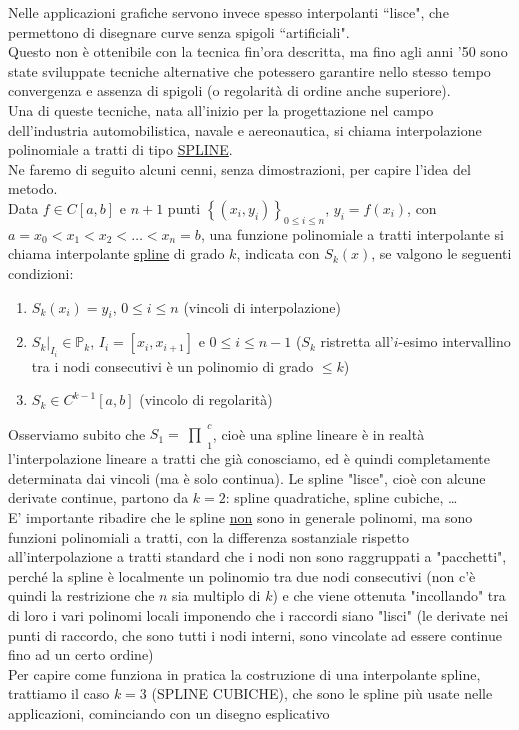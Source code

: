 \documentclass[12pt,a4paper]{article}
\newcommand{\inter}{\begin{matrix}\prod\end{matrix}}
\begin{document}
Nelle applicazioni grafiche servono invece spesso interpolanti ``lisce", che permettono di disegnare curve senza spigoli ``artificiali".\\
Questo non è ottenibile con la tecnica fin'ora descritta, ma fino agli anni '50 sono state sviluppate tecniche alternative che potessero garantire nello stesso tempo convergenza e assenza di spigoli (o regolarità di ordine anche superiore).\\
Una di queste tecniche, nata all'inizio per la progettazione nel campo dell'industria automobilistica, navale e aereonautica, si chiama interpolazione polinomiale a tratti di tipo \underline{SPLINE}.\\
Ne faremo di seguito alcuni cenni, senza dimostrazioni, per capire l'idea del metodo. \\
Data $f \in C[a,b]$ e $n+1$ punti $\left\{ (x_i,y_i) \right\}_{0 \leq i \leq n}$, $y_i=f(x_i)$, con $a=x_0 < x_1 < x_2 <\dots<x_n=b$, una funzione polinomiale a tratti interpolante si chiama interpolante \underline{spline} di grado $k$, indicata con $S_k(x)$, se valgono le seguenti condizioni:
\begin{enumerate}
    \item $S_k(x_i)=y_i$, $0 \leq i \leq n$ (vincoli di interpolazione)
    \item $S_k \vert_{I_i} \in \mathbb{P}_k$, $I_i=[x_i,x_{i+1}]$ e $0 \leq i \leq n-1$ ($S_k$ ristretta all'$i$-esimo intervallino tra i nodi consecutivi è un polinomio di grado $\leq  k$)
    \item $S_k \in C^{k-1}[a,b]$ (vincolo di regolarità)
\end{enumerate}
Osserviamo subito che $S_1=\inter_1^c$, cioè una spline lineare è in realtà l'interpolazione lineare a tratti che già conosciamo, ed è quindi completamente determinata dai vincoli (ma è solo continua). Le spline "lisce", cioè con alcune derivate continue, partono da $k=2$: spline quadratiche, spline cubiche, \dots \\
E' importante ribadire che le spline \underline{non} sono in generale polinomi, ma sono funzioni polinomiali a tratti, con la differenza sostanziale rispetto all'interpolazione a tratti standard che i nodi non sono raggruppati a "pacchetti", perché la spline è localmente un polinomio tra due nodi consecutivi (non c'è quindi la restrizione che $n$ sia multiplo di $k$) e che viene ottenuta "incollando" tra di loro i vari polinomi locali imponendo che i raccordi siano "lisci" (le derivate nei punti di raccordo, che sono tutti i nodi interni, sono vincolate ad essere continue fino ad un certo ordine) \\ Per capire come funziona in pratica la costruzione di una interpolante spline, trattiamo il caso $k=3$ (SPLINE CUBICHE), che sono le spline più usate nelle applicazioni, cominciando con un disegno esplicativo
\end{document}

